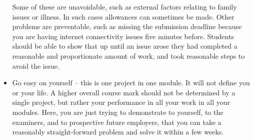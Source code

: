 \documentclass[12pt, a4paper]{article}
\begin{document}
\begin{itemize}
    Some of these are unavoidable, such as external factors relating to family issues or illness.
    In such cases allowances can sometimes be made.
    Other problems are preventable, such as missing the submission deadline because you are having internet connectivity issues five minutes before.
    Students should be able to show that up until an issue arose they had completed a reasonable and proportionate amount of work, and took reasonable steps to avoid the issue.
    \item
    Go easy on yourself -- this is one project in one module.
    It will not define you or your life.
    A higher overall course mark should not be determined by a single project, but rather your performance in all your work in all your modules.
    Here, you are just trying to demonstrate to yourself, to the examiners, and to prospective future employers, that you can take a reasonably straight-forward problem and solve it within a few weeks.
\end{itemize}




\end{document}
